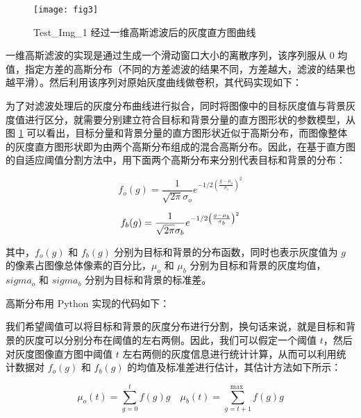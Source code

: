 \begin{figure}[!ht]
	\centering
	\texttt{[image: fig3]}
	\caption{Test\_Img\_1 经过一维高斯滤波后的灰度直方图曲线}
	\label{fig:smoothed_hist}
\end{figure}

一维高斯滤波的实现是通过生成一个滑动窗口大小的离散序列，该序列服从 0 均值，指定方差的高斯分布（不同的方差滤波的结果不同，方差越大，滤波的结果也越平滑）。然后利用该序列对原始灰度曲线做卷积，其代码实现如下：
\vspace{0.3cm}


为了对滤波处理后的灰度分布曲线进行拟合，同时将图像中的目标灰度值与背景灰度值进行区分，就需要分别建立符合目标和背景分量的直方图形状的参数模型，从图 \ref{fig:smoothed_hist} 可以看出，目标分量和背景分量的直方图形状近似于高斯分布，而图像整体的灰度直方图形状即为由两个高斯分布组成的混合高斯分布。因此，在基于直方图的自适应阈值分割方法中，用下面两个高斯分布来分别代表目标和背景的分布：

\begin{equation}
f_o(g)=\frac{1}{\sqrt{2 \pi} \sigma_o} e^{-1 / 2\left(\frac{g-\mu_o}{\sigma_o}\right)^2}
\end{equation}

\begin{equation}
f_b(g)=\frac{1}{\sqrt{2 \pi} \sigma_b} e^{-1 / 2\left(\frac{g-\mu_b}{\sigma_b}\right)^2}
\vspace{0.5cm}
\end{equation}

其中，$f_o(g)$ 和 $f_b(g)$ 分别为目标和背景的分布函数，同时也表示灰度值为 $g$ 的像素占图像总体像素的百分比，$\mu_o$ 和 $\mu_b$ 分别为目标和背景的灰度均值，$sigma_o$ 和 $sigma_b$ 分别为目标和背景的标准差。

高斯分布用 Python 实现的代码如下：
\vspace{0.3cm}


我们希望阈值可以将目标和背景的灰度分布进行分割，换句话来说，就是目标和背景的灰度可以分别分布在阈值的左右两侧。因此，我们可以假定一个阈值 $t$，然后对灰度图像直方图中阈值 $t$ 左右两侧的灰度信息进行统计计算，从而可以利用统计数据对 $f_o(g)$ 和 $f_b(g)$ 的均值及标准差进行估计，其估计方法如下所示：

\begin{equation}
\mu_o(t)=\sum_{g=0}^t f(g) g \quad \mu_b(t)=\sum_{g=t+1}^{\text {max }} f(g) g
\end{equation}

